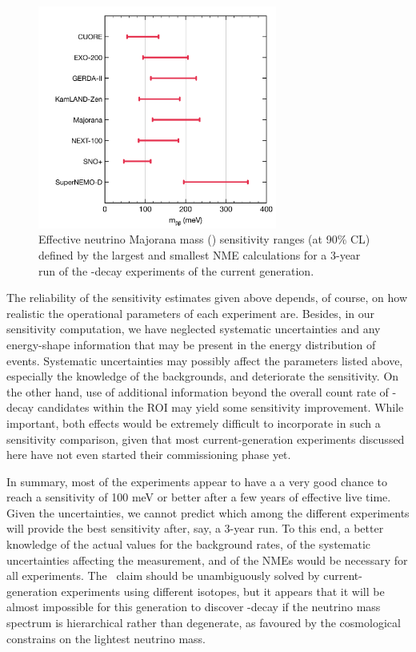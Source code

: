 \documentclass{PoS}
\begin{document}
\begin{figure}
\centering
\includegraphics[width=0.7\textwidth]{img/SensNMCurrentGen3YearsRun.pdf}
\caption{Effective neutrino Majorana mass (\mbb) sensitivity ranges (at 90\% CL) defined by the largest and smallest NME calculations for a 3-year run of the \bbonu-decay experiments of the current generation.} \label{fig:SensNMCurrentGen3YearsRun}
\end{figure}

The reliability of the sensitivity estimates given above depends, of course, on how realistic the operational parameters of each experiment are. Besides, in our sensitivity computation, we have neglected systematic uncertainties and any energy-shape information that may be present in the energy distribution of events. Systematic uncertainties may possibly affect the parameters listed above, especially the knowledge of the backgrounds, and deteriorate the sensitivity. On the other hand, use of additional information beyond the overall count rate of \bbonu-decay candidates within the ROI may yield some sensitivity improvement. While important, both effects would be extremely difficult to incorporate in such a sensitivity comparison, given that most current-generation experiments discussed here have not even started their commissioning phase yet.

In summary, most of the experiments appear to have a a very good chance to reach a sensitivity of 100 meV or better after a few years of effective live time. Given the uncertainties, we cannot predict which among the different experiments will provide the best sensitivity after, say, a 3-year run. To this end, a better knowledge of the actual values for the background rates, of the systematic uncertainties affecting the measurement, and of the NMEs would be necessary for all experiments. The \GE\ claim should be unambiguously solved by current-generation experiments using different isotopes, but it appears that it will be almost impossible for this generation to discover \bbonu-decay if the neutrino mass spectrum is hierarchical rather than degenerate, as favoured by the cosmological constrains on the lightest neutrino mass. 
\end{document}
